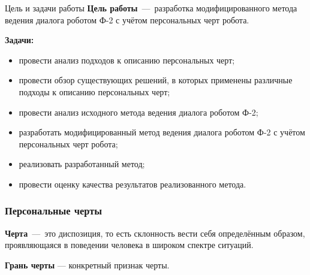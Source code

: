 \documentclass{beamer}
\begin{document}
\begin{frame}{\centering Цель и задачи работы}
    \textbf{Цель работы}~---~разработка модифицированного метода ведения диалога роботом Ф-2 с учётом персональных черт робота.

    \vfill
    \textbf{Задачи:}
    \begin{itemize}
        \item[---] провести анализ подходов к описанию персональных черт;
        \item[---] провести обзор существующих решений, в которых применены различные подходы к описанию персональных черт;
        \item[---] провести анализ исходного метода ведения диалога роботом Ф-2;
        \item[---] разработать модифицированный метод ведения диалога роботом Ф-2 с учётом персональных черт робота;
        \item[---] реализовать разработанный метод;
        \item[---] провести оценку качества результатов реализованного метода.
    \end{itemize}
\end{frame}


\begin{frame}
    \frametitle{Персональные черты}
    \small\textbf{Черта}~---~это диспозиция, то есть склонность вести себя определённым образом, проявляющаяся в поведении человека в широком спектре ситуаций. %

    \textbf{Грань черты} --- конкретный признак черты.

    \begin{figure}
        \centering
        
    \end{figure}
\end{frame}
\end{document}
